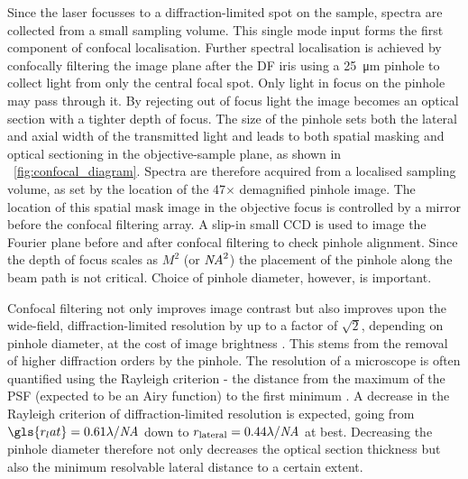 \documentclass{article}
\begin{document}
Since the laser focusses to a diffraction-limited spot on the sample, spectra are collected from a small sampling volume. This single mode input forms the first component of confocal localisation. Further spectral localisation is achieved by confocally filtering the image plane after the DF iris using a \SI{25}{\micro\metre} pinhole to collect light from only the central focal spot. Only light in focus on the pinhole may pass through it. By rejecting out of focus light the image becomes an optical section with a tighter depth of focus. The size of the pinhole sets both the lateral and axial width of the transmitted light and leads to both spatial masking and optical sectioning in the objective-sample plane, as shown in \figurename~\ref{fig:confocal_diagram}. Spectra are therefore acquired from a localised sampling volume, as set by the location of the 47$\times$ demagnified pinhole image. The location of this spatial mask image in the objective focus is controlled by a mirror before the confocal filtering array. A slip-in small CCD is used to image the Fourier plane before and after confocal filtering to check pinhole alignment. Since the depth of focus scales as $M^2$ (or $\mathit{NA}^2$) the placement of the pinhole along the beam path is not critical. Choice of pinhole diameter, however, is important.

Confocal filtering not only improves image contrast but also improves upon the wide-field, diffraction-limited resolution by up to a factor of $\sqrt{2}$, depending on pinhole diameter, at the cost of image brightness \cite{webb1996confocal, murphy2002fundamentals, cox2004practical, hollricher2011high}. This stems from the removal of higher diffraction orders by the pinhole. The resolution of a microscope is often quantified using the Rayleigh criterion - the distance from the maximum of the PSF (expected to be an Airy function) to the first minimum  \cite{born1999principles}. A decrease in the Rayleigh criterion of diffraction-limited resolution is expected, going from $\gls{r_lat}=0.61\lambda/\NA$ down to $r_{\mathrm{lateral}}=0.44\lambda/\mathit{NA}$ at best.
Decreasing the pinhole diameter therefore not only decreases the optical section thickness but also the minimum resolvable lateral distance to a certain extent.
\end{document}
